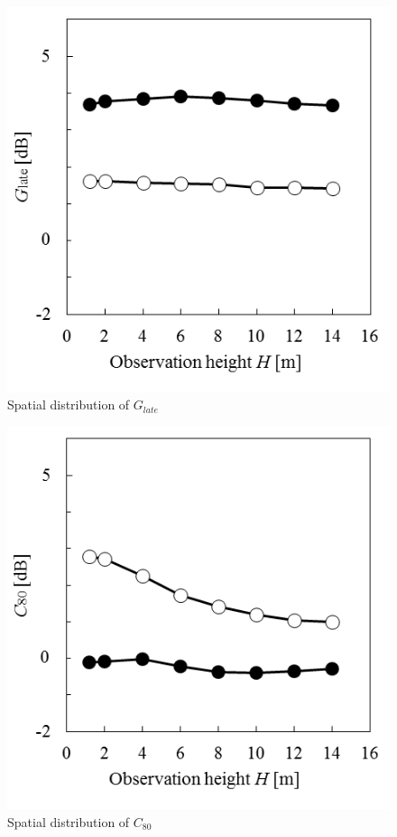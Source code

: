 \begin{figure}[htbp]
    \centering
    \includegraphics[keepaspectratio,scale=1]{04_att/Gl.png}
    \caption{\hspace{1mm}Spatial distribution of $G_{late}$}
    \label{fig:Gl}
\end{figure}

\begin{figure}[htbp]
    \centering
    \includegraphics[keepaspectratio,scale=1]{04_att/C.png}
    \caption{\hspace{1mm}Spatial distribution of $C_{80}$}
    \label{fig:C}
\end{figure}
